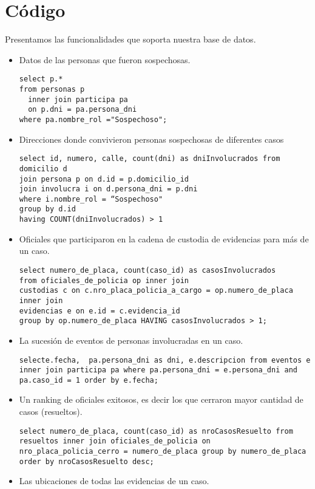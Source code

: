 \documentclass[10pt,a4paper]{article}
\begin{document}
\section{Código}
Presentamos las funcionalidades que soporta nuestra base de datos.
\begin{itemize}
\item Datos de las personas que fueron sospechosas.
\begin{verbatim}
select p.* 
from personas p 
  inner join participa pa 
  on p.dni = pa.persona_dni 
where pa.nombre_rol ="Sospechoso";
\end{verbatim}
\item Direcciones donde convivieron personas sospechosas de diferentes casos
\begin{verbatim}
select id, numero, calle, count(dni) as dniInvolucrados from domicilio d
join persona p on d.id = p.domicilio_id
join involucra i on d.persona_dni = p.dni
where i.nombre_rol = “Sospechoso"
group by d.id
having COUNT(dniInvolucrados) > 1
\end{verbatim}
\item Oficiales que participaron en la cadena de custodia de evidencias para más de un
caso.
\begin{verbatim}
select numero_de_placa, count(caso_id) as casosInvolucrados
from oficiales_de_policia op inner join 
custodias c on c.nro_placa_policia_a_cargo = op.numero_de_placa inner join 
evidencias e on e.id = c.evidencia_id 
group by op.numero_de_placa HAVING casosInvolucrados > 1;
\end{verbatim}
\item La sucesión de eventos de personas involucradas en un caso.
\begin{verbatim}
selecte.fecha,  pa.persona_dni as dni, e.descripcion from eventos e inner join participa pa where pa.persona_dni = e.persona_dni and pa.caso_id = 1 order by e.fecha;
\end{verbatim}
\item Un ranking de oficiales exitosos, es decir los que cerraron mayor cantidad de casos
(resueltos).
\begin{verbatim}
select numero_de_placa, count(caso_id) as nroCasosResuelto from resueltos inner join oficiales_de_policia on nro_placa_policia_cerro = numero_de_placa group by numero_de_placa order by nroCasosResuelto desc;
\end{verbatim}
\item Las ubicaciones de todas las evidencias de un caso.
\begin{verbatim}

\end{verbatim}
\end{itemize}
\end{document}
